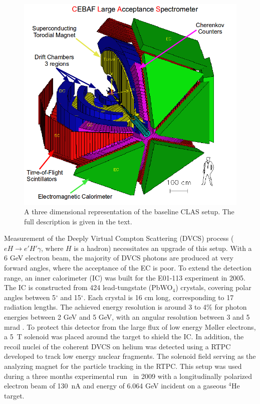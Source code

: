 \documentclass[twocolumn,showpacs,superscriptaddress,groupedaddress]{revtex4}
\begin{document}
\begin{figure}[tbp]
\centering \includegraphics[scale=0.3]{fig/test_clas.png}
\caption{A three dimensional representation of the baseline CLAS setup. The
   full description is given in the text.} \label{fig:CLAS}
\end{figure}

Measurement of the Deeply Virtual Compton Scattering (DVCS) process
($eH \rightarrow e' H' \gamma$, where $H$ is a hadron) necessitates an upgrade
of this setup.  With a 6 GeV electron beam, the majority of DVCS photons are produced
at very forward angles, where the acceptance of the EC is poor. To extend the detection range,
an inner calorimeter (IC) was built for the E01-113 experiment in 2005.
The IC is constructed from 424 lead-tungstate (PbWO$_{4}$) crystals, covering polar 
angles between 5$^{\circ}$ and 15$^{\circ}$. Each crystal is 16 cm long, corresponding
to 17 radiation lengths. The achieved energy resolution is around 3 to 4$\%$ for photon
energies between 2 GeV and 5 GeV, with an angular resolution between 3 and 5 mrad 
\cite{Hyon-suk}. To protect this detector from the large flux of low energy M{\o}ller 
electrons, a 5~T solenoid was placed around the target to shield the IC. 
In addition, the recoil nuclei of the coherent DVCS on helium was detected 
using a RTPC developed to track low energy nuclear fragments. The solenoid field
serving as the analyzing magnet for the particle tracking in the RTPC. This 
setup was used during a three months experimental run~\cite{proposal1,proposal2}
in 2009 with a longitudinally polarized electron beam of 130~nA 
and energy of 6.064 GeV incident on a gaseous $^{4}$He target.
\end{document}
